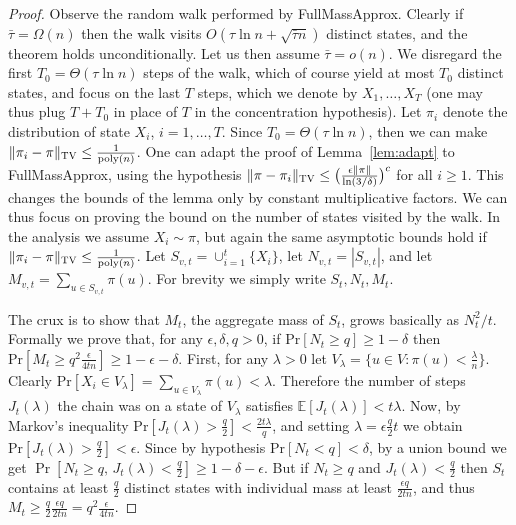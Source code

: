 \documentclass[a4paper,11pt]{article}
\newcommand{\E}{\mathbb{E}}
\newcommand{\prob}{\text{Pr}}
\newcommand{\poly}{\operatorname{poly}}
\newcommand{\tvd}[2]{\| {#1 - #2} \|_\textsc{TV}}
\newcommand{\taunest}{FullMassApprox}
\begin{document}
\begin{proof}
Observe the random walk performed by \taunest.
Clearly if $\bar{\tau} = \Omega(n)$ then the walk visits $O(\tau\ln n  + \sqrt{\bar{\tau}n})$ distinct states, and the theorem holds unconditionally.
Let us then assume $\bar{\tau} = o(n)$.
We disregard the first $T_0 = \Theta(\tau\ln n)$ steps of the walk, which of course yield at most $T_0$ distinct states, and focus on the last $T$ steps, which we denote by $X_1,\ldots,X_T$ (one may thus plug $T+T_0$ in place of $T$ in the concentration hypothesis).
Let $\pi_i$ denote the distribution of state $X_i$, $i=1,\ldots,T$.
Since $T_0 = \Theta(\tau\ln n)$, then we can make $\tvd{\pi_i}{\pi} \le \frac{1}{\poly(n)}$.
One can adapt the proof of Lemma~\ref{lem:adapt} to \taunest, using the hypothesis $\tvd{\pi}{\pi_i} \le \big(\frac{\epsilon \|\pi\|}{\ln(3/\delta)}\big)^c$ for all $i \ge 1$.
This changes the bounds of the lemma only by constant multiplicative factors.
We can thus focus on proving the bound on the number of states visited by the walk.
In the analysis we assume $X_i \sim \pi$, but again the same asymptotic bounds hold if $\tvd{\pi_i}{\pi} \le \frac{1}{\poly(n)}$.
Let $S_{v,t} = \cup_{i=1}^t \{X_i\}$, let $N_{v,t} = |S_{v,t}|$, and let $M_{v,t} = \sum_{u \in S_{v,t}} \pi(u)$.
For brevity we simply write $S_t, N_t, M_t$.

The crux is to show that $M_t$, the aggregate mass of $S_t$, grows basically as $N_t^2/t$.
Formally we prove that, for any $\epsilon,\delta, q > 0$, if $\prob[N_t \ge q] \ge 1-\delta$ then $\prob[M_t \ge q^2\frac{\epsilon}{4tn}] \ge 1-\epsilon - \delta$.
First, for any $\lambda > 0$ let $V_{\lambda} = \{u \in V : \pi(u) < \frac{\lambda}{n} \}$.
Clearly $\prob[X_i \in V_{\lambda}] = \sum_{u \in V_{\lambda}} \pi(u) < \lambda$.
Therefore the number of steps $J_t(\lambda)$ the chain was on a state of $V_{\lambda}$ satisfies $\E[J_t(\lambda)]< t \lambda$.
Now, by Markov's inequality $\prob[J_t(\lambda) > \frac{q}{2}] < \frac{2 t \lambda}{q}$, and setting $\lambda=\epsilon \frac{q}{2} t$ we obtain $\prob[J_t(\lambda) > \frac{q}{2}] < \epsilon$.
Since by hypothesis $\prob[N_t < q] < \delta$, by a union bound we get $\Pr[N_t \ge q, \, J_t(\lambda) < \frac{q}{2}] \ge 1 - \delta - \epsilon$.
But if $N_t \ge q$ and $J_t(\lambda) < \frac{q}{2}$ then $S_t$ contains at least $\frac{q}{2}$ distinct states with individual mass at least $\frac{\epsilon q}{2tn}$, and thus $M_t \ge \frac{q}{2} \frac{\epsilon q}{2tn} = q^2\frac{\epsilon}{4tn}$.


\end{proof}
\end{document}
